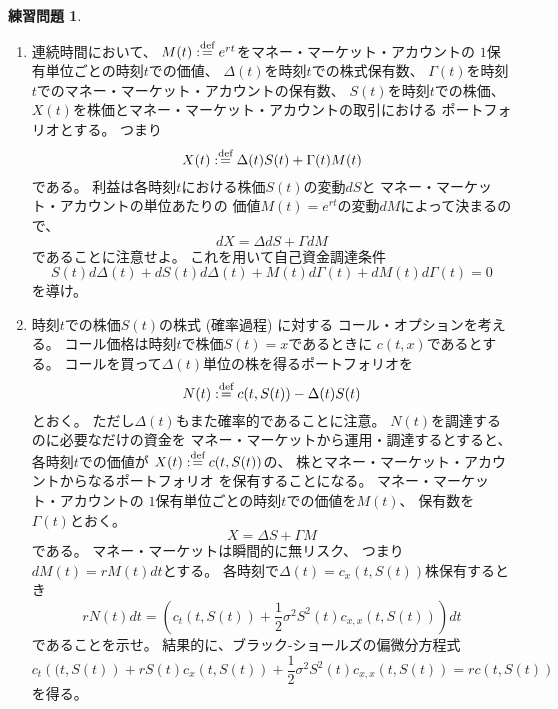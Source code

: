 \documentclass[uplatex]{jsarticle}
\theoremstyle{definition}
\newtheorem{prob}[prob]{練習問題}
\def\dfn{:\overset{\mbox{{\scriptsize def}}}{=}}
\begin{document}
\begin{prob}\label{prob: 4.10}
  \
  \begin{enumerate}
    \item \label{enumi: 4.10-1}
    連続時間において、
    \(M(t) \dfn e^{rt}\)をマネー・マーケット・アカウントの
    \(1\)保有単位ごとの時刻\(t\)での価値、
    \(\Delta(t)\)を時刻\(t\)での株式保有数、
    \(\Gamma(t)\)を時刻\(t\)でのマネー・マーケット・アカウントの保有数、
    \(S(t)\)を時刻\(t\)での株価、
    \(X(t)\)を株価とマネー・マーケット・アカウントの取引における
    ポートフォリオとする。
    つまり
    \[
    X(t) \dfn \Delta(t)S(t) + \Gamma(t)M(t)
    \]
    である。
    利益は各時刻\(t\)における株価\(S(t)\)の変動\(dS\)と
    マネー・マーケット・アカウントの単位あたりの
    価値\(M(t)=e^{rt}\)の変動\(dM\)によって決まるので、
    \[
    dX = \Delta dS + \Gamma dM
    \]
    であることに注意せよ。
    これを用いて自己資金調達条件
    \[
    S(t)d\Delta(t) + dS(t)d\Delta(t) + M(t)d\Gamma(t) + dM(t)d\Gamma(t)
    = 0
    \]
    を導け。
    \item \label{enumi: 4.10-2}
    時刻\(t\)での株価\(S(t)\)の株式 (確率過程) に対する
    コール・オプションを考える。
    コール価格は時刻\(t\)で株価\(S(t)=x\)であるときに
    \(c(t,x)\)であるとする。
    コールを買って\(\Delta(t)\)単位の株を得るポートフォリオを
    \[N(t) \dfn c(t,S(t)) - \Delta(t)S(t)\]
    とおく。
    ただし\(\Delta(t)\)もまた確率的であることに注意。
    \(N(t)\)を調達するのに必要なだけの資金を
    マネー・マーケットから運用・調達するとすると、
    各時刻\(t\)での価値が
    \(X(t) \dfn c(t,S(t))\)の、
    株とマネー・マーケット・アカウントからなるポートフォリオ
    を保有することになる。
    マネー・マーケット・アカウントの
    \(1\)保有単位ごとの時刻\(t\)での価値を\(M(t)\)、
    保有数を\(\Gamma(t)\)とおく。
    \[
    X = \Delta S + \Gamma M
    \]
    である。
    マネー・マーケットは瞬間的に無リスク、
    つまり\(dM(t) = rM(t)dt\)とする。
    各時刻で\(\Delta(t) = c_x(t,S(t))\)株保有するとき
    \[
    rN(t)dt = \left( c_t(t,S(t))
    + \frac{1}{2}\sigma^2S^2(t)c_{x,x}(t,S(t))\right) dt
    \]
    であることを示せ。
    結果的に、ブラック-ショールズの偏微分方程式
    \[
    c_t\left((t,S(t)\right) + rS(t)c_x\left(t,S(t)\right)
    + \frac{1}{2}\sigma^2S^2(t)c_{x,x}\left(t,S(t)\right)
    =rc\left(t,S(t)\right)
    \]
    を得る。
  \end{enumerate}
\end{prob}
\end{document}
